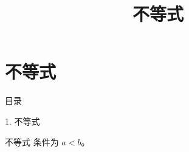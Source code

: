 \documentclass[aspectratio=169,10pt,fontset=fandol]{ctexbeamer}
\title{不等式}
\begin{document}
\section{不等式}
\begin{frame}[t,fragile]{目录}
\normalsize
{\color{blue}\normalsize 1. 不等式\par}\vspace{0.22em}
\end{frame}
\begin{frame}[t,fragile]{不等式}
\normalsize
{\normalsize
条件为 $a<b$。
}
\end{frame}
\end{document}
